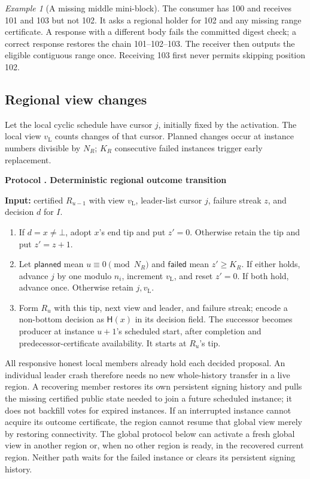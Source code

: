 \documentclass[11pt,a4paper,onecolumn]{article}
\newcommand{\Hash}{\mathsf H}
\newcommand{\lv}{v_{\mathrm L}}
\newcommand{\botv}{\bot}
\theoremstyle{remark}\newtheorem{example}[definition]{Example}
\newcounter{protocol}
\newenvironment{protocol}[2]{\refstepcounter{protocol}\label{#1}\begin{mdframed}[nobreak=true,linewidth=.6pt,skipabove=10pt,skipbelow=10pt,innertopmargin=8pt,innerbottommargin=8pt]\small\raggedright\noindent\textbf{Protocol \theprotocol. #2}\par\smallskip}{\end{mdframed}}
\begin{document}
\begin{example}[A missing middle mini-block]
The consumer has 100 and receives 101 and 103 but not 102. It asks a regional
holder for 102 and any missing range certificate. A response with a different
body fails the committed digest check; a correct response restores the chain
101--102--103. The receiver then outputs the eligible contiguous range once.
Receiving 103 first never permits skipping position 102.
\end{example}

\subsection{Regional view changes}\label{sec:localchange}
Let the local cyclic schedule have cursor $j$, initially fixed by the activation.
The local view $\lv$ counts changes of that cursor. Planned changes occur at
instance numbers divisible by $N_R$; $K_R$ consecutive failed instances trigger
early replacement.

\begin{protocol}{alg:localchange}{Deterministic regional outcome transition}
\textbf{Input:} certified $R_{u-1}$ with view $\lv$, leader-list cursor $j$,
failure streak $z$, and decision $d$ for $I$.
\begin{enumerate}[label=\textbf{L\arabic*.}]
\item If $d=x\neq\botv$, adopt $x$'s end tip and put $z'=0$.
Otherwise retain the tip and put $z'=z+1$.
\item Let $\mathsf{planned}$ mean $u\equiv0\pmod{N_R}$ and
$\mathsf{failed}$ mean $z'\geq K_R$.
If either holds, advance $j$ by one modulo $n_i$, increment $\lv$, and reset
$z'=0$. If both hold, advance once. Otherwise retain $j,\lv$.
\item Form $R_u$ with this tip, next view and leader, and failure streak;
encode a non-bottom decision as $\Hash(x)$ in its decision field.
The successor becomes producer at instance $u+1$'s scheduled start, after
completion and predecessor-certificate availability. It starts at $R_u$'s tip.
\end{enumerate}
\end{protocol}

All responsive honest local members already hold each decided proposal. An individual
leader crash therefore needs no new whole-history transfer in a live region.
A recovering member restores its own persistent signing history and pulls the
missing certified public state needed to join a future scheduled instance;
it does not backfill votes for expired
instances. If an interrupted instance cannot acquire its outcome certificate,
the region cannot resume that global view merely by restoring connectivity.
The global protocol below can activate a fresh global view in another region
or, when no other region is ready, in the recovered current region. Neither
path waits for the failed instance or clears its persistent signing history.
\end{document}
